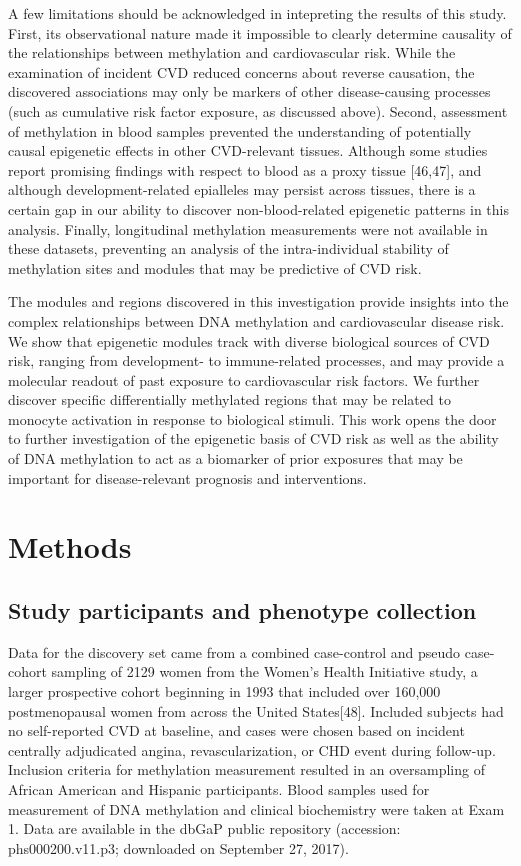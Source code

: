 \documentclass[]{article}
\theoremstyle{definition}
\theoremstyle{definition}
\theoremstyle{definition}
\theoremstyle{remark}
\begin{document}
A few limitations should be acknowledged in intepreting the results of
this study. First, its observational nature made it impossible to
clearly determine causality of the relationships between methylation and
cardiovascular risk. While the examination of incident CVD reduced
concerns about reverse causation, the discovered associations may only
be markers of other disease-causing processes (such as cumulative risk
factor exposure, as discussed above). Second, assessment of methylation
in blood samples prevented the understanding of potentially causal
epigenetic effects in other CVD-relevant tissues. Although some studies
report promising findings with respect to blood as a proxy tissue
{[}46,47{]}, and although development-related epialleles may persist
across tissues, there is a certain gap in our ability to discover
non-blood-related epigenetic patterns in this analysis. Finally,
longitudinal methylation measurements were not available in these
datasets, preventing an analysis of the intra-individual stability of
methylation sites and modules that may be predictive of CVD risk.

The modules and regions discovered in this investigation provide
insights into the complex relationships between DNA methylation and
cardiovascular disease risk. We show that epigenetic modules track with
diverse biological sources of CVD risk, ranging from development- to
immune-related processes, and may provide a molecular readout of past
exposure to cardiovascular risk factors. We further discover specific
differentially methylated regions that may be related to monocyte
activation in response to biological stimuli. This work opens the door
to further investigation of the epigenetic basis of CVD risk as well as
the ability of DNA methylation to act as a biomarker of prior exposures
that may be important for disease-relevant prognosis and interventions.

\section{Methods}\label{methods}

\subsection{Study participants and phenotype
collection}\label{study-participants-and-phenotype-collection}

Data for the discovery set came from a combined case-control and pseudo
case-cohort sampling of 2129 women from the Women's Health Initiative
study, a larger prospective cohort beginning in 1993 that included over
160,000 postmenopausal women from across the United States{[}48{]}.
Included subjects had no self-reported CVD at baseline, and cases were
chosen based on incident centrally adjudicated angina,
revascularization, or CHD event during follow-up. Inclusion criteria for
methylation measurement resulted in an oversampling of African American
and Hispanic participants. Blood samples used for measurement of DNA
methylation and clinical biochemistry were taken at Exam 1. Data are
available in the dbGaP public repository (accession: phs000200.v11.p3;
downloaded on September 27, 2017).
\end{document}
